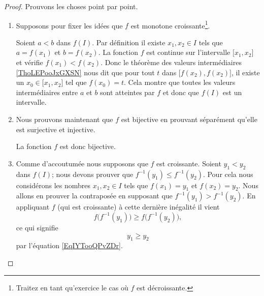 \begin{proof}

    Prouvons les choses point par point. 

    \begin{enumerate}
    \item

        Supposons pour fixer les idées que \( f\) est monotone croissante\footnote{Traitez en tant qu'exercice le cas où \( f\) est décroissante.}.
        
        Soient \( a< b\) dans \( f(I)\). Par définition il existe \( x_1,x_2\in I\) tels que \( a=f(x_1)\) et \( b=f(x_2)\). La fonction \( f\) est continue sur l'intervalle \( \mathopen[ x_1 , x_2 \mathclose]\) et vérifie \( f(x_1)<f(x_2)\). Donc le théorème des valeurs intermédiaires \ref{ThoLEPooJxGXSN} nous dit que pour tout \( t\) dans \( \mathopen[ f(x_2) , f(x_2) \mathclose]\), il existe un \( x_0\in\mathopen[ x_1 , x_2 \mathclose]\) tel que \( f(x_0)=t\). Cela montre que toutes les valeurs intermédiaires entre \( a\) et \( b\) sont atteintes par \( f\) et donc que \( f(I)\) est un intervalle.

    \item

    Nous prouvons maintenant que \( f\) est bijective en prouvant séparément qu'elle est surjective et injective.

    La fonction \( f\) est donc bijective.

\item

    Comme d'accoutumée nous supposons que \( f\) est croissante. Soient \( y_1<y_2\) dans \( f(I)\); nous devons prouver que \( f^{-1}(y_1)\leq f^{-1}(y_2)\). Pour cela nous considérons les nombres \( x_1,x_2\in I\) tels que \( f(x_1)=y_1\) et \( f(x_2)=y_2\). Nous allons en prouver la contraposée en supposant que \( f^{-1}(y_1)>f^{-1}(y_2)\). En appliquant \( f\) (qui est croissante) à cette dernière inégalité il vient
    \begin{equation}
        f\big( f^{-1}(y_1) \big)\geq f\big( f^{-1}(y_2) \big),
    \end{equation}
    ce qui signifie
    \begin{equation}
        y_1\geq y_2
    \end{equation}
    par l'équation \eqref{EqIYTooQPvZDr}.


\end{enumerate}
\end{proof}

